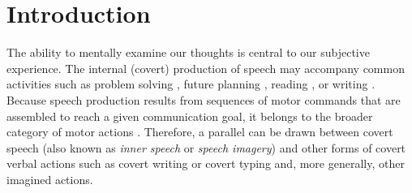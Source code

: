 \documentclass[utf8]{template/frontiersSCNS} %
\begin{document}
\newpage

\section{Introduction}




The ability to mentally examine our thoughts is central to our subjective experience. The internal (covert) production of speech may accompany common activities such as problem solving \citep{baldo_is_2005, sokolov_inner_1972}, future planning \citep{dargembeau_frequency_2011}, reading \citep[e.g.,][]{loevenbruck_left_2005, perrone-bertolotti_how_2012}, or writing \citep{frith_reading_1979}. Because speech production results from sequences of motor commands that are assembled to reach a given communication goal, it belongs to the broader category of motor actions \citep{jeannerod_motor_2006}. Therefore, a parallel can be drawn between covert speech (also known as \textit{inner speech} or \textit{speech imagery}) \citep[for reviews, see][]{alderson-day_inner_2015, perrone-bertolotti_what_2014, loevenbruck_cognitive_2018} and other forms of covert verbal actions such as covert writing or covert typing and, more generally, other imagined actions.
\end{document}
